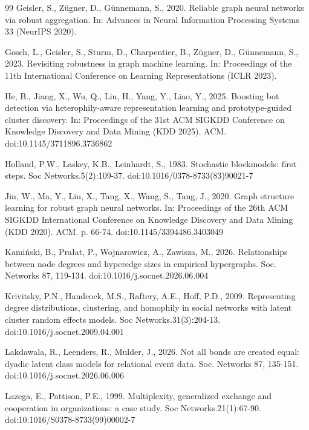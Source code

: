 \documentclass[preprint,12pt,authoryear]{elsarticle}
\theoremstyle{definition}
\begin{document}
\begin{thebibliography}{99}
Geisler, S., Z\"ugner, D., G\"unnemann, S., 2020. Reliable graph neural networks via robust aggregation. In: Advances in Neural Information Processing Systems 33 (NeurIPS 2020).

Gosch, L., Geisler, S., Sturm, D., Charpentier, B., Z\"ugner, D., G\"unnemann, S., 2023. Revisiting robustness in graph machine learning. In: Proceedings of the 11th International Conference on Learning Representations (ICLR 2023).

He, B., Jiang, X., Wu, Q., Liu, H., Yang, Y., Liao, Y., 2025. Boosting bot detection via heterophily-aware representation learning and prototype-guided cluster discovery. In: Proceedings of the 31st ACM SIGKDD Conference on Knowledge Discovery and Data Mining (KDD 2025). ACM. doi:10.1145/3711896.3736862

Holland, P.W., Laskey, K.B., Leinhardt, S., 1983. Stochastic blockmodels: first steps. Soc Networks.5(2):109-37. doi:10.1016/0378-8733(83)90021-7

Jin, W., Ma, Y., Liu, X., Tang, X., Wang, S., Tang, J., 2020. Graph structure learning for robust graph neural networks. In: Proceedings of the 26th ACM SIGKDD International Conference on Knowledge Discovery and Data Mining (KDD 2020). ACM. p. 66-74. doi:10.1145/3394486.3403049

Kami\'nski, B., Pra{\l}at, P., Wojnarowicz, A., Zawisza, M., 2026. Relationships between node degrees and hyperedge sizes in empirical hypergraphs. Soc. Networks 87, 119-134. doi:10.1016/j.socnet.2026.06.004

Krivitsky, P.N., Handcock, M.S., Raftery, A.E., Hoff, P.D., 2009. Representing degree distributions, clustering, and homophily in social networks with latent cluster random effects models. Soc Networks.31(3):204-13. doi:10.1016/j.socnet.2009.04.001

Lakdawala, R., Leenders, R., Mulder, J., 2026. Not all bonds are created equal: dyadic latent class models for relational event data. Soc. Networks 87, 135-151. doi:10.1016/j.socnet.2026.06.006

Lazega, E., Pattison, P.E., 1999. Multiplexity, generalized exchange and cooperation in organizations: a case study. Soc Networks.21(1):67-90. doi:10.1016/S0378-8733(99)00002-7


\end{thebibliography}
\end{document}
